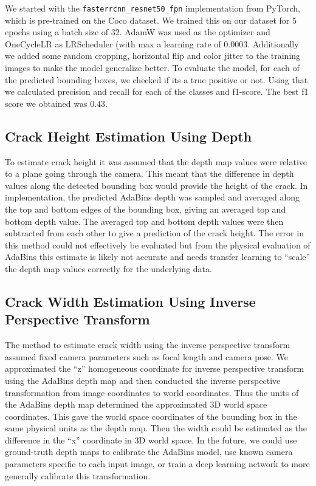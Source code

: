 \documentclass{article}
\begin{document}
We started with the \verb|fasterrcnn_resnet50_fpn| implementation from PyTorch, which is pre-trained on the Coco dataset. We trained this on our dataset for 5 epochs using a batch size of 32. AdamW was used as the optimizer and OneCycleLR as LRScheduler (with max a learning rate of $0.0003$. Additionally we added some random cropping, horizontal flip and color jitter to the training images to make the model generalize better. To evaluate the model, for each of the predicted bounding boxes, we checked if its a true positive or not. Using that we calculated precision and recall for each of the classes and f1-score. The best f1 score we obtained was $0.43$.

\subsection{Crack Height Estimation Using Depth}
To estimate crack height it was assumed that the depth map values were relative to a plane going through the camera. 
This meant that the difference in depth values along the detected bounding box would provide the height of the crack.
In implementation, the predicted AdaBins depth was sampled and averaged along the top and bottom edges of the bounding box, giving an averaged top and bottom depth value.
The averaged top and bottom depth values were then subtracted from each other to give a prediction of the crack height.
The error in this method could not effectively be evaluated but from the physical evaluation of AdaBins this estimate is likely not accurate and needs transfer learning to ``scale'' the depth map values correctly for the underlying data.

\subsection{Crack Width Estimation Using Inverse Perspective Transform}
The method to estimate crack width using the inverse perspective transform assumed fixed camera parameters such as focal length and camera pose.
We approximated the ``z'' homogeneous coordinate for inverse perspective transform using the AdaBins depth map and then conducted the inverse perspective transformation from image coordinates to world coordinates.
Thus the units of the AdaBins depth map determined the approximated 3D world space coordinates. 
This gave the world space coordinates of the bounding box in the same physical units as the depth map.
Then the width could be estimated as the difference in the ``x'' coordinate in 3D world space.
In the future, we could use ground-truth depth maps to calibrate the AdaBins model, use known camera parameters specific to each input image, or train a deep learning network to more generally calibrate this transformation. 
\end{document}
